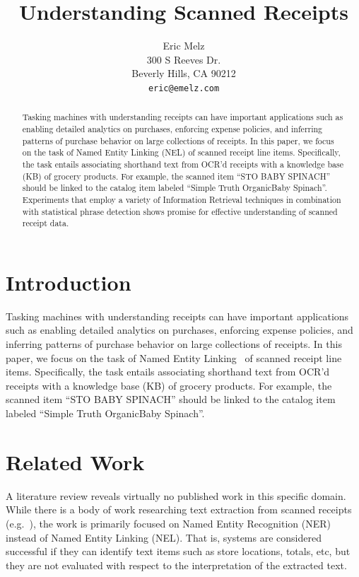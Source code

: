 \documentclass[11pt,a4paper]{article}
\title{Understanding Scanned Receipts}
\author{Eric Melz \\
  300 S Reeves Dr. \\
  Beverly Hills, CA 90212 \\
  \texttt{eric@emelz.com}
}
\date{}
\begin{document}
\maketitle
\begin{abstract}
Tasking machines with understanding receipts can have important
applications such as enabling detailed analytics on purchases,
enforcing expense policies, and inferring patterns of purchase
behavior on large collections of receipts.  In this paper, we focus on
the task of Named Entity Linking (NEL) of 
scanned receipt line items.  Specifically, the task entails
associating shorthand text from OCR’d receipts with a knowledge base
(KB) of grocery products.  For example, the scanned item ``STO BABY
SPINACH'' should be linked to the catalog item labeled ``Simple Truth
Organic\texttrademark Baby Spinach''.  Experiments that employ a variety of
Information Retrieval techniques in combination with statistical
phrase detection shows promise for effective understanding of scanned
receipt data.

\end{abstract}

\section{Introduction}

Tasking machines with understanding receipts can have important
applications such as enabling detailed analytics on purchases,
enforcing expense policies, and inferring patterns of purchase
behavior on large collections of receipts.  In this paper, we focus on
the task of Named Entity Linking~\cite{Hachey:2012} of
scanned receipt line items.  Specifically, the task entails
associating shorthand text from OCR’d receipts with a knowledge base
(KB) of grocery products.  For example, the scanned item ``STO BABY
SPINACH'' should be linked to the catalog item labeled ``Simple Truth
Organic\texttrademark Baby Spinach''.  

\section{Related Work}

A literature review reveals virtually no published work in this
specific domain.  While there is a body of work researching text
extraction from scanned receipts (e.g.~\citealp{Huang:2019}), the work is primarily
focused on Named Entity Recognition (NER) instead of Named Entity
Linking (NEL).  That is, systems are considered successful if they can
identify text items such as store locations, totals, etc, but they are
not evaluated with respect to the interpretation of the extracted
text.
\end{document}
